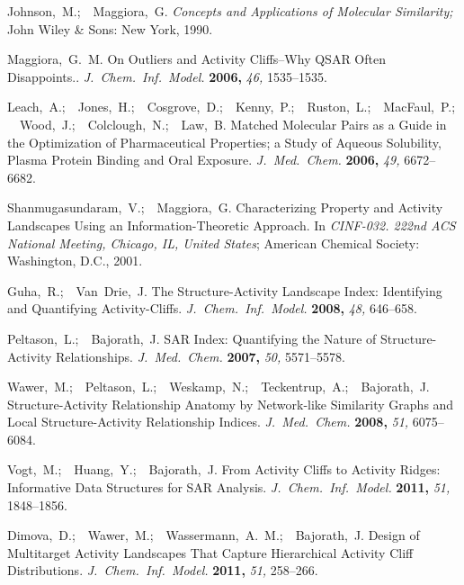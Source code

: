 \documentclass[letterpaper, 12pt]{article}
\begin{document}
\providecommand{\refin}[1]{\\ \textbf{Referenced in:} #1}
\begin{thebibliography}{10}

Johnson,~M.;\ \ Maggiora,~G. \textit{Concepts and Applications of Molecular
  Similarity;} John Wiley \& Sons: New York, 1990.

Maggiora,~G.~M.  On Outliers and Activity Cliffs--Why {QSAR} Often
  Disappoints..  \textit{J.~Chem.~Inf.~Model.} \textbf{2006,} \textsl{46,}
  1535--1535.

Leach,~A.;\ \ Jones,~H.;\ \ Cosgrove,~D.;\ \ Kenny,~P.;\ \ Ruston,~L.;\ \
  MacFaul,~P.;\ \ Wood,~J.;\ \ Colclough,~N.;\ \ Law,~B.  Matched Molecular
  Pairs as a Guide in the Optimization of Pharmaceutical Properties; a Study of
  Aqueous Solubility, Plasma Protein Binding and Oral Exposure.
  \textit{J.~Med.~Chem.} \textbf{2006,} \textsl{49,} 6672--6682.

Shanmugasundaram,~V.;\ \ Maggiora,~G.  Characterizing Property and Activity
  Landscapes Using an Information-Theoretic Approach.   In  \textit{CINF-032.
  222nd ACS National Meeting, Chicago, IL, United States}; American Chemical
  Society: Washington, D.C., 2001.

Guha,~R.;\ \ Van~Drie,~J.  The Structure-Activity Landscape Index:
  {I}dentifying and Quantifying Activity-Cliffs.  \textit{J.~Chem.~Inf.~Model.}
  \textbf{2008,} \textsl{48,} 646--658.

Peltason,~L.;\ \ Bajorath,~J.  SAR Index: Quantifying the Nature of
  Structure-Activity Relationships.  \textit{J.~Med.~Chem.} \textbf{2007,}
  \textsl{50,} 5571--5578.

Wawer,~M.;\ \ Peltason,~L.;\ \ Weskamp,~N.;\ \ Teckentrup,~A.;\ \ Bajorath,~J.
  Structure-Activity Relationship Anatomy by Network-like Similarity Graphs and
  Local Structure-Activity Relationship Indices.  \textit{J.~Med.~Chem.}
  \textbf{2008,} \textsl{51,} 6075--6084.

Vogt,~M.;\ \ Huang,~Y.;\ \ Bajorath,~J.  From Activity Cliffs to Activity
  Ridges: {I}nformative Data Structures for SAR Analysis.
  \textit{J.~Chem.~Inf.~Model.} \textbf{2011,} \textsl{51,} 1848--1856.

Dimova,~D.;\ \ Wawer,~M.;\ \ Wassermann,~A.~M.;\ \ Bajorath,~J.  Design of
  Multitarget Activity Landscapes That Capture Hierarchical Activity Cliff
  Distributions.  \textit{J.~Chem.~Inf.~Model.} \textbf{2011,} \textsl{51,}
  258--266.


\end{thebibliography}
\end{document}
